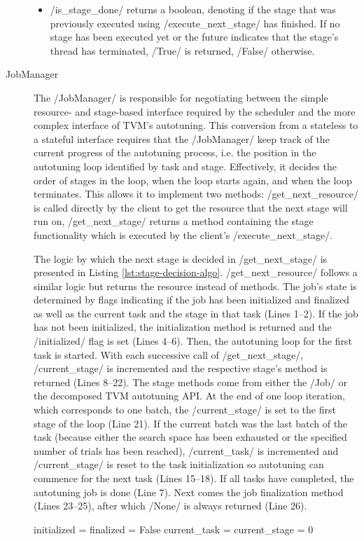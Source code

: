 \begin{description}
\begin{itemize}
		\item \pythoninline/is_stage_done/ returns a boolean, denoting if the stage that was previously executed using \pythoninline/execute_next_stage/ has finished. If no stage has been executed yet or the future indicates that the stage's thread has terminated,  \pythoninline/True/ is returned,  \pythoninline/False/ otherwise.
	\end{itemize}
	\item[JobManager] The \pythoninline/JobManager/ is responsible for negotiating between the simple resource- and stage-based interface required by the scheduler and the more complex interface of TVM's autotuning. This conversion from a stateless to a stateful interface requires that the \pythoninline/JobManager/ keep track of the current progress of the autotuning process, i.e. the position in the autotuning loop identified by task and stage. Effectively, it decides the order of stages in the loop, when the loop starts again, and when the loop terminates. This allows it to implement two methods: \pythoninline/get_next_resource/ is called directly by the client to get the resource that the next stage will run on, \pythoninline/get_next_stage/ returns a method containing the stage functionality which is executed by the client's \pythoninline/execute_next_stage/.\par
	The logic by which the next stage is decided in \pythoninline/get_next_stage/ is presented in Listing \ref{lst:stage-decision-algo}. \pythoninline/get_next_resource/ follows a similar logic but returns the resource instead of methods. The job's state is determined by flags indicating if the job has been initialized and finalized as well as the current task and the stage in that task (Lines 1--2). If the job has not been initialized, the initialization method is returned and the \pythoninline/initialized/ flag is set (Lines 4--6). Then, the autotuning loop for the first task is started. With each successive call of \pythoninline/get_next_stage/, \pythoninline/current_stage/ is incremented and the respective stage's method is returned (Lines 8--22). The stage methods come from either the \pythoninline/Job/ or the decomposed TVM autotuning API. At the end of one loop iteration, which corresponds to one batch, the \pythoninline/current_stage/ is set to the first stage of the loop (Line 21). If the current batch was the last batch of the task (because either the search space has been exhausted or the specified number of trials has been reached), \pythoninline/current_task/ is incremented and \pythoninline/current_stage/ is reset to the task initialization so autotuning can commence for the next task (Lines 15--18). If all tasks have completed, the autotuning job is done (Line 7). Next comes the job finalization method (Lines 23--25), after which \pythoninline/None/ is always returned (Line 26).\par
\begin{listing}[h]
\begin{pythoncode}
initialized = finalized = False
current_task = current_stage = 0


\end{pythoncode}
\end{listing}
\end{description}
